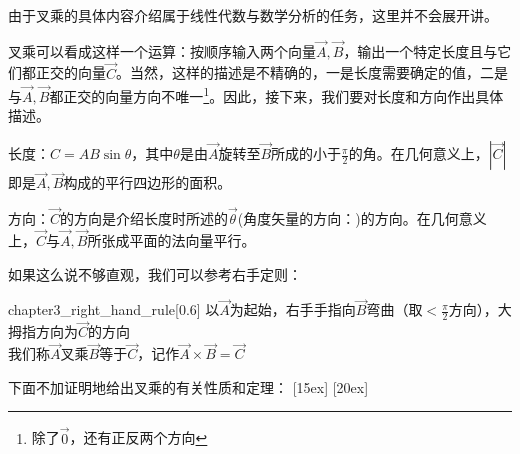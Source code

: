 由于叉乘的具体内容介绍属于线性代数与数学分析的任务，这里并不会展开讲。

叉乘可以看成这样一个运算：按顺序输入两个向量$\vec{A},\vec{B}$，输出一个特定长度且与它们都正交的向量$\vec{C}$。当然，这样的描述是不精确的，一是长度需要确定的值，二是与$\vec{A},\vec{B}$都正交的向量方向不唯一\footnote{除了$\vec{0}$，还有正反两个方向}。因此，接下来，我们要对长度和方向作出具体描述。

\begin{Itemize}
	\item 长度：$C=AB\sin\theta$，其中$\theta$是由$\vec{A}$旋转至$\vec{B}$所成的小于$\frac{\pi}{2}$的角\footnotemark 。在几何意义上，$|\vec{C}|$即是$\vec{A},\vec{B}$构成的平行四边形的面积。
	\item 方向：$\vec{C}$的方向是介绍长度时所述的$\vec{\theta}$(角度矢量的方向：)的方向。在几何意义上，$\vec{C}$与$\vec{A},\vec{B}$所张成平面的法向量平行。
\end{Itemize}

如果这么说不够直观，我们可以参考右手定则：

\begin{singlefigure}{chapter3_right_hand_rule}[0.6]
	以$\vec{A}$为起始，右手手指向$\vec{B}$弯曲（取$<\frac{\pi}{2}$方向），大拇指方向为$\vec{C}$的方向\\
	我们称$\vec{A}$叉乘$\vec{B}$等于$\vec{C}$，记作$\vec{A}\times\vec{B}=\vec{C}$
\end{singlefigure}

下面不加证明地给出叉乘的有关性质和定理：
[15ex]
[20ex]

